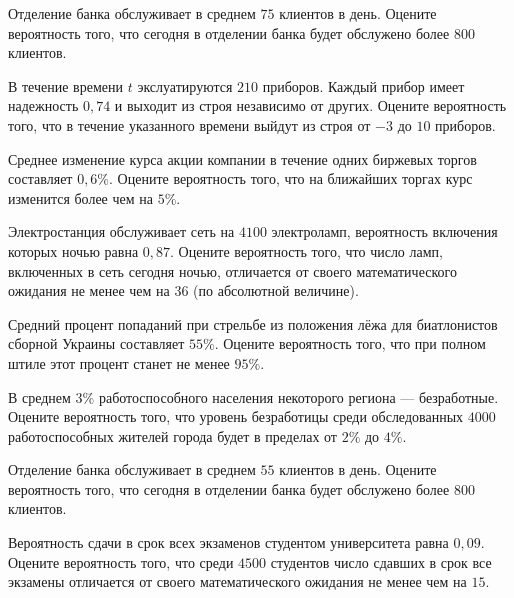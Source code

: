 \z Отделение банка обслуживает в среднем $ 75 $ клиентов в день. Оцените вероятность того, что сегодня в отделении банка будет обслужено более $ 800 $ клиентов.


\vfill

\z В течение времени $t$ экслуатируются $ 210 $ приборов. Каждый прибор имеет надежность $ 0{,}74 $ и выходит из строя независимо от других. Оцените вероятность того, что в течение указанного времени выйдут из строя от $ -3 $ до $ 10 $ приборов.
 

\vfill

\newpage\setcounter{zad}{0}

\z Среднее изменение курса акции компании в течение одних биржевых торгов составляет $ 0{,}6 \% $. Оцените вероятность того, что на ближайших торгах курс изменится более чем на $ 5 \% $.


\vfill

\z Электростанция обслуживает сеть на $ 4100 $ электроламп, вероятность включения которых ночью равна $ 0{,}87 $. Оцените вероятность того, что число ламп, включенных в сеть сегодня ночью, отличается от своего математического ожидания не менее чем на $ 36 $ (по абсолютной величине). 
 

\vfill

\newpage\setcounter{zad}{0}

\z Средний процент попаданий при стрельбе из положения лёжа для биатлонистов сборной Украины составляет $ 55 \% $. Оцените вероятность того, что при полном штиле этот процент станет не менее $ 95 \% $.


\vfill

\z В среднем $ 3 \% $ работоспособного населения некоторого региона --- безработные. Оцените вероятность того, что уровень безработицы среди обследованных $ 4000 $ работоспособных жителей города будет в пределах от $ 2 \%$ до $ 4 \%$.
 

\vfill

\newpage\setcounter{zad}{0}

\z Отделение банка обслуживает в среднем $ 55 $ клиентов в день. Оцените вероятность того, что сегодня в отделении банка будет обслужено более $ 800 $ клиентов.


\vfill

\z Вероятность сдачи в срок всех экзаменов студентом университета равна $ 0{,}09 $. Оцените вероятность того, что среди $ 4500 $ студентов число сдавших в срок все экзамены отличается от своего математического ожидания не менее чем на $ 15 $. 
 

